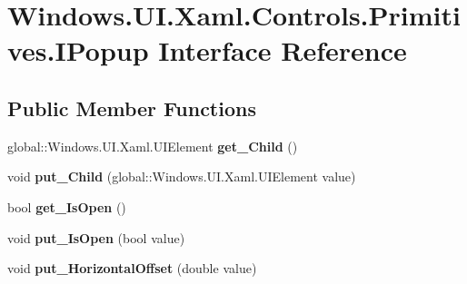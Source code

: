 \hypertarget{interface_windows_1_1_u_i_1_1_xaml_1_1_controls_1_1_primitives_1_1_i_popup}{}\section{Windows.\+U\+I.\+Xaml.\+Controls.\+Primitives.\+I\+Popup Interface Reference}
\label{interface_windows_1_1_u_i_1_1_xaml_1_1_controls_1_1_primitives_1_1_i_popup}
\subsection*{Public Member Functions}
\begin{DoxyCompactItemize}
\item 
\mbox{\label{interface_windows_1_1_u_i_1_1_xaml_1_1_controls_1_1_primitives_1_1_i_popup_a2a367d0d43b67f93a3e5d442297dcbd5}} 
global\+::\+Windows.\+U\+I.\+Xaml.\+U\+I\+Element {\bfseries get\+\_\+\+Child} ()
\item 
\mbox{\label{interface_windows_1_1_u_i_1_1_xaml_1_1_controls_1_1_primitives_1_1_i_popup_a693a09a15b78af4217a6b3f0aac82e7c}} 
void {\bfseries put\+\_\+\+Child} (global\+::\+Windows.\+U\+I.\+Xaml.\+U\+I\+Element value)
\item 
\mbox{\label{interface_windows_1_1_u_i_1_1_xaml_1_1_controls_1_1_primitives_1_1_i_popup_a57fdf0a3dab46fba797ba81ba77b6670}} 
bool {\bfseries get\+\_\+\+Is\+Open} ()
\item 
\mbox{\label{interface_windows_1_1_u_i_1_1_xaml_1_1_controls_1_1_primitives_1_1_i_popup_a259760eea17810fafe0d637b9df53848}} 
void {\bfseries put\+\_\+\+Is\+Open} (bool value)
\item 
\mbox{\label{interface_windows_1_1_u_i_1_1_xaml_1_1_controls_1_1_primitives_1_1_i_popup_affde5c52107f2ff7472b84b7b7a1ab4d}} 
void {\bfseries put\+\_\+\+Horizontal\+Offset} (double value)

\end{DoxyCompactItemize}
